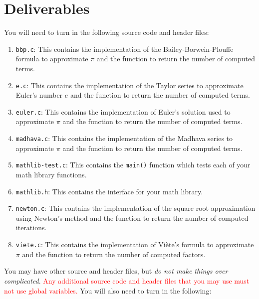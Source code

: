 \section{Deliverables}

You will need to turn in the following source code and header files:

\begin{enumerate}
  \item \texttt{bbp.c}: This contains the implementation of the
    Bailey-Borwein-Plouffe formula to approximate $\pi$ and the function
    to return the number of computed terms.
  \item \texttt{e.c}: This contains the implementation of the Taylor
    series to approximate Euler's number $e$ and the function to return
    the number of computed terms.
  \item \texttt{euler.c}: This contains the implementation of Euler's
    solution used to approximate $\pi$ and the function to return the
    number of computed terms.
  \item \texttt{madhava.c}: This contains the implementation of the
    Madhava series to approximate $\pi$ and the function to return the
    number of computed terms.
  \item \texttt{mathlib-test.c}: This contains the \texttt{main()}
    function which tests each of your math library functions.
  \item \texttt{mathlib.h}: This contains the interface for your math
    library.
  \item \texttt{newton.c}: This contains the implementation of the
    square root approximation using Newton's method and the function to
    return the number of computed iterations.
  \item \texttt{viete.c}: This contains the implementation of
    Vi\`{e}te's formula to approximate $\pi$ and the function to return
    the number of computed factors.
\end{enumerate}

You may have other source and header files, but \emph{do not make things
over complicated}. \textcolor{red}{Any additional source code and header
files that you may use must not use global variables.}
You will also need to turn in the following:

